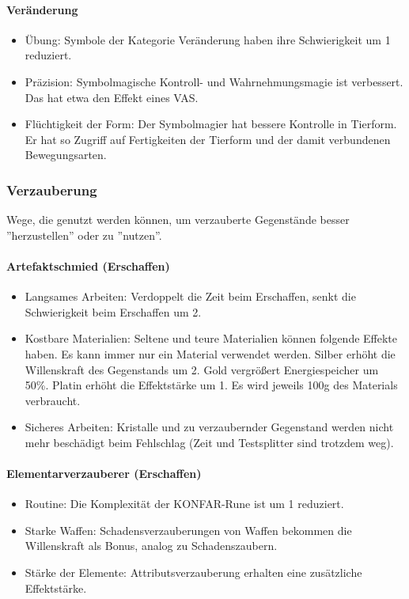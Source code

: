 \documentclass{article}
\begin{document}
\paragraph{Veränderung}

\begin{itemize}
\item Übung: Symbole der Kategorie Veränderung haben ihre Schwierigkeit um 1 reduziert.
\item Präzision: Symbolmagische Kontroll- und Wahrnehmungsmagie ist verbessert. Das hat etwa den Effekt eines VAS.
\item Flüchtigkeit der Form: Der Symbolmagier hat bessere Kontrolle in Tierform. Er hat so Zugriff auf Fertigkeiten der Tierform und der damit verbundenen Bewegungsarten.
\end{itemize}

\subsubsection{Verzauberung}

Wege, die genutzt werden können, um verzauberte Gegenstände besser ''herzustellen'' oder zu ''nutzen''.

\paragraph{Artefaktschmied (Erschaffen)}

\begin{itemize}
\item Langsames Arbeiten: Verdoppelt die Zeit beim Erschaffen, senkt die Schwierigkeit beim Erschaffen um 2.
\item Kostbare Materialien: Seltene und teure Materialien können folgende Effekte haben. Es kann immer nur ein Material verwendet werden. Silber erhöht die Willenskraft des Gegenstands um 2. Gold vergrößert Energiespeicher um 50\%. Platin erhöht die Effektstärke um 1. Es wird jeweils 100g des Materials verbraucht.
\item Sicheres Arbeiten: Kristalle und zu verzaubernder Gegenstand werden nicht mehr beschädigt beim Fehlschlag (Zeit und Testsplitter sind trotzdem weg).
\end{itemize}

\paragraph{Elementarverzauberer (Erschaffen)}

\begin{itemize}
\item Routine: Die Komplexität der KONFAR-Rune ist um 1 reduziert.
\item Starke Waffen: Schadensverzauberungen von Waffen bekommen die Willenskraft als Bonus, analog zu Schadenszaubern.
\item Stärke der Elemente: Attributsverzauberung erhalten eine zusätzliche Effektstärke.
\end{itemize}
\end{document}
